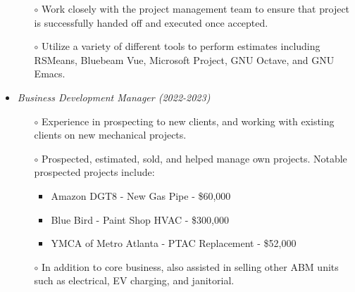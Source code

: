 \documentclass[margin]{res}
\begin{document}
\begin{resume}
\begin{itemize}
\begin{itemize}
            \item[$\circ$] Work closely with the project management team to ensure that project is successfully handed off and executed once accepted.
            \item[$\circ$] Utilize a variety of different tools to perform estimates including RSMeans, Bluebeam Vue, Microsoft Project, GNU Octave, and GNU Emacs.
      \end{itemize}
      \item {\sl Business Development Manager (2022-2023)}
      \begin{itemize}
            \item[$\circ$] Experience in prospecting to new clients, and working with existing clients on new mechanical projects.
              \item[$\circ$] Prospected, estimated, sold, and helped manage own projects. Notable prospected projects include:
              \begin{itemize}
                \item Amazon DGT8 - New Gas Pipe - \$60,000
                \item Blue Bird - Paint Shop HVAC - \$300,000
                \item YMCA of Metro Atlanta - PTAC Replacement - \$52,000
              \end{itemize}
            \item[$\circ$] In addition to core business, also assisted in selling other ABM units such as electrical, EV charging, and janitorial.  
            \end{itemize}
            \end{itemize}
            

\end{resume}
\end{document}
